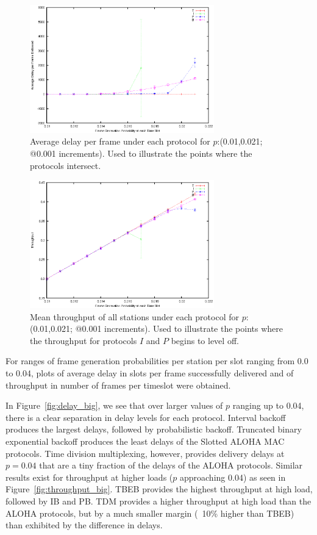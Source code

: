 \documentclass[twocolumn]{article}
\begin{document}
\begin{figure}
    \centering \includegraphics[width=8cm]{plots/tpbi_delay.eps}
    \caption{\footnotesize Average delay per frame under each protocol for
    $p$:(0.01,0.021; @0.001 increments). Used to illustrate the points where the
    protocols intersect.} \label{fig:delay_diverging}
\end{figure}

\begin{figure}
    \centering \includegraphics[width=8cm]{plots/tpbi_throughput.eps}
    \caption{\footnotesize Mean throughput of all stations under each protocol
    for $p$:(0.01,0.021; @0.001 increments). Used to illustrate the points where
    the throughput for protocols $I$ and $P$ begins to level off.}
    \label{fig:throughput_diverging}
\end{figure}


For ranges of frame generation probabilities per station per slot ranging
from 0.0 to 0.04, plots of average delay in slots per frame successfully delivered and
of throughput in number of frames per timeslot were obtained. 

In Figure~\ref{fig:delay_big}, we see that over larger values of $p$ ranging up to
0.04, there is a clear separation in delay levels for each protocol. Interval backoff
produces the largest delays, followed by probabilistic backoff. Truncated binary exponential
backoff produces the least delays of the Slotted ALOHA MAC protocols. Time division multiplexing,
however, provides delivery delays at $p=0.04$ that are a tiny fraction of the delays of the 
ALOHA protocols. Similar results exist for throughput at higher loads ($p$ approaching 0.04) as 
seen in Figure~\ref{fig:throughput_big}. TBEB provides the highest throughput at high load,
followed by IB and PB. TDM provides a higher throughput at high load than the ALOHA protocols,
but by a much smaller margin (~10\% higher than TBEB) than exhibited by the difference in
delays.
\end{document}
